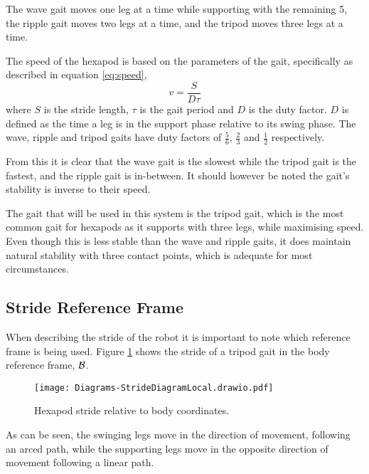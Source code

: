         \noindent
        The wave gait moves one leg at a time while supporting with the remaining 5, the ripple gait moves two legs at a time, and the tripod moves three legs at a time.

        The speed of the hexapod is based on the parameters of the gait, specifically as described in equation \ref{eq:speed},
        \begin{equation} \label{eq:speed}
            v = \frac{S}{D\tau}
        \end{equation}
        where \(S\) is the stride length, \(\tau\) is the gait period and \(D\) is the duty factor. \(D\) is defined as the time a leg is in the support phase relative to its swing phase. The wave, ripple and tripod gaits have duty factors of \(\frac{5}{6}\), \(\frac{2}{3}\) and \(\frac{1}{2}\) respectively.
        
        From this it is clear that the wave gait is the slowest while the tripod gait is the fastest, and the ripple gait is in-between. It should however be noted the gait's stability is inverse to their speed.

        The gait that will be used in this system is the tripod gait, which is the most common gait for hexapods as it supports with three legs, while maximising speed. Even though this is less stable than
        the wave and ripple gaits, it does maintain natural stability with three contact points, which is adequate for most circumstances.

        \subsection{Stride Reference Frame}
            When describing the stride of the robot it is important to note which reference frame is being used. Figure \ref{fig:stride_body} shows
            the stride of a tripod gait in the body reference frame, \(\fbody\).
            \begin{figure}[h]
                \centering
                \texttt{[image: Diagrams-StrideDiagramLocal.drawio.pdf]}
                \caption{Hexapod stride relative to body coordinates.}
                \label{fig:stride_body}
            \end{figure}

            \noindent
            As can be seen, the swinging legs move in the direction of movement, following an arced path, while the supporting legs move in the opposite direction of movement following a linear path. 


